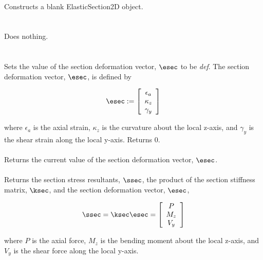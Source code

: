  \\
Constructs a blank ElasticSection2D object. \\

 \\
 \\ 
Does nothing. \\

 \\
  \\
Sets the value of the section deformation vector, $\esec$ to be {\em
def}. The section deformation vector, $\esec$, is defined by

\begin{equation}
\esec := \left[
   \begin{array}{c}
       \epsilon_a \\
       \kappa_z   \\
       \gamma_y
   \end{array} 
 \right]
\end{equation}

where $\epsilon_a$ is the axial strain, $\kappa_z$ is the curvature about
the local z-axis, and $\gamma_y$ is the shear strain along the local y-axis.
Returns $0$. \\

 \\
Returns the current value of the section deformation vector, $\esec$. \\

 \\
Returns the section stress resultants, $\ssec$, the product of the 
section stiffness matrix, $\ksec$, and the section deformation 
vector, $\esec$,

\begin{equation}
\ssec = \ksec \esec = \left[
   \begin{array}{c}
       P \\
       M_z   \\
       V_y
   \end{array} 
 \right]
\end{equation}

where $P$ is the axial force, $M_z$ is the bending moment about the
local z-axis, and $V_y$ is the shear force along the local y-axis. \\

